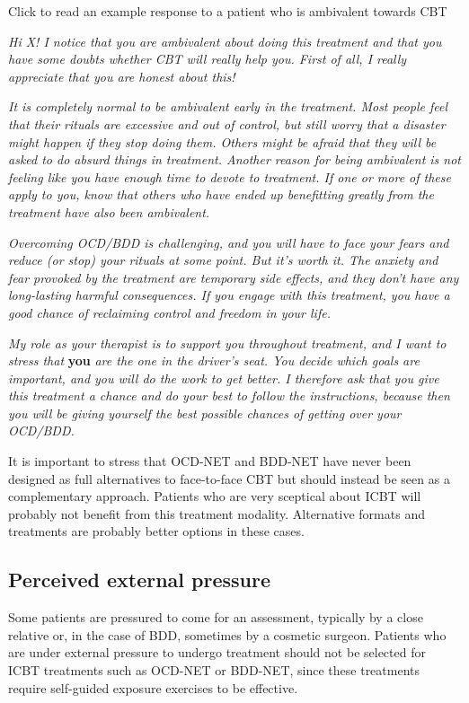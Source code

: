 \documentclass[]{book}
\begin{document}
 Click to read an example response to a patient who is ambivalent towards CBT

\emph{Hi X! I notice that you are ambivalent about doing this treatment and that you have some doubts whether CBT will really help you. First of all, I really appreciate that you are honest about this!}

\emph{It is completely normal to be ambivalent early in the treatment. Most people feel that their rituals are excessive and out of control, but still worry that a disaster might happen if they stop doing them. Others might be afraid that they will be asked to do absurd things in treatment. Another reason for being ambivalent is not feeling like you have enough time to devote to treatment. If one or more of these apply to you, know that others who have ended up benefitting greatly from the treatment have also been ambivalent.}

\emph{Overcoming OCD/BDD is challenging, and you will have to face your fears and reduce (or stop) your rituals at some point. But it's worth it. The anxiety and fear provoked by the treatment are temporary side effects, and they don't have any long-lasting harmful consequences. If you engage with this treatment, you have a good chance of reclaiming control and freedom in your life.}

\emph{My role as your therapist is to support you throughout treatment, and I want to stress that} \textbf{you} \emph{are the one in the driver's seat. You decide which goals are important, and you will do the work to get better. I therefore ask that you give this treatment a chance and do your best to follow the instructions, because then you will be giving yourself the best possible chances of getting over your OCD/BDD.}

It is important to stress that OCD-NET and BDD-NET have never been designed as full alternatives to face-to-face CBT but should instead be seen as a complementary approach. Patients who are very sceptical about ICBT will probably not benefit from this treatment modality. Alternative formats and treatments are probably better options in these cases.

\hypertarget{perceived-external-pressure}{%
\subsection{Perceived external pressure}\label{perceived-external-pressure}}

Some patients are pressured to come for an assessment, typically by a close relative or, in the case of BDD, sometimes by a cosmetic surgeon. Patients who are under external pressure to undergo treatment should not be selected for ICBT treatments such as OCD-NET or BDD-NET, since these treatments require self-guided exposure exercises to be effective.
\end{document}
